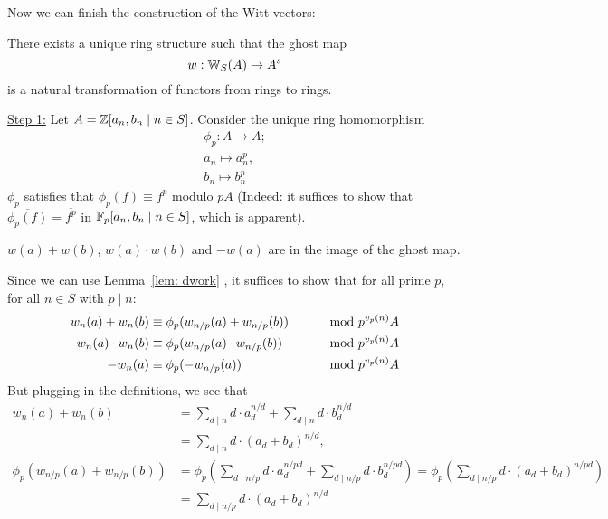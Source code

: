 Now we can finish the construction of the Witt vectors:
\begin{theorem} \label{thm: existence of witt vectors}
    There exists a unique ring structure such that the ghost map 
    \[
      w:\mathbb{W}_S(A) \to A^s  
    \]
    is a natural transformation of functors from rings to rings.
\end{theorem}
\begin{bigproof}
    \underline{Step 1:} Let $A=\mathbb{Z} [a_n,b_n \mid n \in S]$. Consider the unique
    ring homomorphism 
    \begin{align*}
        \phi_p \colon A \to A; \\
        a_n \mapsto a_n^p, \\
        b_n \mapsto b_n^p
    \end{align*}
    $\phi_p$ satisfies that $\phi_p(f) \equiv f^p$ modulo $pA$ (Indeed: it suffices to show that $\overline{\phi_p(f)}
    = \overline{f^p}$ in $\mathbb{F}_p[a_n,b_n \mid n \in S]$, which is apparent). 
    \begin{claim*}
        $w(a)+w(b)$, $w(a) \cdot w(b)$ and $-w(a)$ are in the image of the ghost map.
    \end{claim*}
    \begin{smallproof}
        Since we can use Lemma~\ref{lem: dwork} , it suffices to show that
        for all prime $p$, for all $n \in S$ with $p \mid n$:
        \begin{align*}
           w_n(a)+w_n(b) &\equiv \phi_p(w_{n/p}(a)+w_{n/p}(b)) &\text{\hskip8mm mod } p^{v_p(n)}A \\
           w_n(a)\cdot w_n(b) &\equiv \phi_p(w_{n/p}(a) \cdot w_{n/p}(b)) &\text{\hskip8mm mod } p^{v_p(n)}A \\
           -w_n(a) &\equiv \phi_p(-w_{n/p}(a)) &\text{\hskip8mm mod } p^{v_p(n)}A
        \end{align*} 
        But plugging in the definitions, we see that
        \begin{align*}
            w_n(a)+w_n(b) &= \sum_{d \mid n} d \cdot a_d^{n/d} + 
            \sum_{d \mid n} d \cdot b_d^{n/d} \\
            &= \sum_{d \mid n} d \cdot (a_d+b_d)^{n/d}, \\
            \phi_p(w_{n/p}(a)+w_{n/p}(b))
            &= \phi_p \left(\sum_{d \mid n/p} d \cdot a_d^{n/pd} + \sum_{d \mid n/p} d \cdot b_d^{n/pd}\right)
            = \phi_p\left(\sum_{d \mid n/p}d \cdot (a_d + b_d)^{n/pd}\right) \\
            &= \sum_{d \mid n/p} d \cdot (a_d+b_d)^{n/d}

\end{align*}
\end{smallproof}
\end{bigproof}
